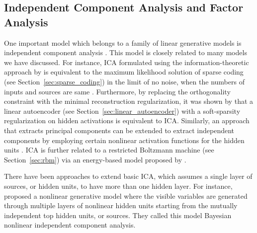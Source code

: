 \documentclass{now}
\begin{document}


\subsection{Independent Component Analysis and Factor Analysis}
\label{sec:ica_fa}

One important model which belongs to a family of linear
generative models is independent component analysis
\citep[ICA, see, e.g.,][]{Hyvarinen2001}. This model is closely related to
many models we have discussed.  For instance, ICA formulated
using the information-theoretic approach by \citet{Bell1995}
is equivalent to the maximum likelihood solution of sparse
coding (see Section~\ref{sec:sparse_coding}) in the limit of
no noise, when the numbers of inputs and
sources are same \citep{Olshausen1997}.  Furthermore, by
replacing the orthogonality constraint with the minimal
reconstruction regularization, it was shown by
\citet{Le2011} that a linear autoencoder (see
Section~\ref{sec:linear_autoencoder}) with a
soft-sparsity regularization on hidden activations is
equivalent to ICA. Similarly, an approach that extracts
principal components can be extended to extract independent
components by employing certain nonlinear
activation functions for the hidden units \citep[see,
e.g.,][]{Oja1997,Hyvarinen2001}. ICA is further related
to a restricted Boltzmann machine (see
Section~\ref{sec:rbm}) via an energy-based model proposed by
\citet{Teh2003}.

There have been approaches to extend basic ICA, which
assumes a single layer of sources, or hidden units, to have
more than one hidden layer. For instance,
\citet{Lappalainen2000} proposed a nonlinear generative
model where the visible variables are generated through
multiple layers of nonlinear hidden units starting from the
mutually independent top hidden units, or sources. They
called this model Bayesian nonlinear independent component
analysis. 
\end{document}

